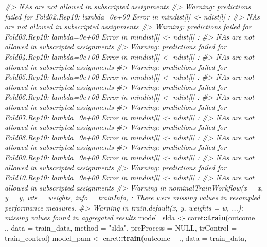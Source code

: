 \documentclass[]{book}
\newenvironment{Shaded}{\begin{snugshade}}{\end{snugshade}}
\newcommand{\CommentTok}[1]{\textcolor[rgb]{0.56,0.35,0.01}{\textit{#1}}}
\newcommand{\DataTypeTok}[1]{\textcolor[rgb]{0.13,0.29,0.53}{#1}}
\newcommand{\KeywordTok}[1]{\textcolor[rgb]{0.13,0.29,0.53}{\textbf{#1}}}
\newcommand{\NormalTok}[1]{#1}
\newcommand{\OperatorTok}[1]{\textcolor[rgb]{0.81,0.36,0.00}{\textbf{#1}}}
\newcommand{\OtherTok}[1]{\textcolor[rgb]{0.56,0.35,0.01}{#1}}
\newcommand{\StringTok}[1]{\textcolor[rgb]{0.31,0.60,0.02}{#1}}
\begin{document}
\begin{Shaded}
\begin{Highlighting}[]
\CommentTok{#>   NAs are not allowed in subscripted assignments}
\CommentTok{#> Warning: predictions failed for Fold02.Rep10: lambda=0e+00 Error in mindist[l] <- ndist[l] : }
\CommentTok{#>   NAs are not allowed in subscripted assignments}
\CommentTok{#> Warning: predictions failed for Fold03.Rep10: lambda=0e+00 Error in mindist[l] <- ndist[l] : }
\CommentTok{#>   NAs are not allowed in subscripted assignments}
\CommentTok{#> Warning: predictions failed for Fold04.Rep10: lambda=0e+00 Error in mindist[l] <- ndist[l] : }
\CommentTok{#>   NAs are not allowed in subscripted assignments}
\CommentTok{#> Warning: predictions failed for Fold05.Rep10: lambda=0e+00 Error in mindist[l] <- ndist[l] : }
\CommentTok{#>   NAs are not allowed in subscripted assignments}
\CommentTok{#> Warning: predictions failed for Fold06.Rep10: lambda=0e+00 Error in mindist[l] <- ndist[l] : }
\CommentTok{#>   NAs are not allowed in subscripted assignments}
\CommentTok{#> Warning: predictions failed for Fold07.Rep10: lambda=0e+00 Error in mindist[l] <- ndist[l] : }
\CommentTok{#>   NAs are not allowed in subscripted assignments}
\CommentTok{#> Warning: predictions failed for Fold08.Rep10: lambda=0e+00 Error in mindist[l] <- ndist[l] : }
\CommentTok{#>   NAs are not allowed in subscripted assignments}
\CommentTok{#> Warning: predictions failed for Fold09.Rep10: lambda=0e+00 Error in mindist[l] <- ndist[l] : }
\CommentTok{#>   NAs are not allowed in subscripted assignments}
\CommentTok{#> Warning: predictions failed for Fold10.Rep10: lambda=0e+00 Error in mindist[l] <- ndist[l] : }
\CommentTok{#>   NAs are not allowed in subscripted assignments}
\CommentTok{#> Warning in nominalTrainWorkflow(x = x, y = y, wts = weights, info = trainInfo, : There were missing values in resampled performance measures.}
\CommentTok{#> Warning in train.default(x, y, weights = w, ...): missing values found in aggregated results}
\NormalTok{model_slda <-}\StringTok{ }\NormalTok{caret}\OperatorTok{::}\KeywordTok{train}\NormalTok{(outcome }\OperatorTok{~}\StringTok{ }\NormalTok{.,}
                             \DataTypeTok{data =}\NormalTok{ train_data,}
                             \DataTypeTok{method =} \StringTok{"slda"}\NormalTok{,}
                             \DataTypeTok{preProcess =} \OtherTok{NULL}\NormalTok{,}
                             \DataTypeTok{trControl =}\NormalTok{ train_control)}
\NormalTok{model_pam <-}\StringTok{ }\NormalTok{caret}\OperatorTok{::}\KeywordTok{train}\NormalTok{(outcome }\OperatorTok{~}\StringTok{ }\NormalTok{.,}
                             \DataTypeTok{data =}\NormalTok{ train_data,}

\end{Highlighting}
\end{Shaded}
\end{document}

